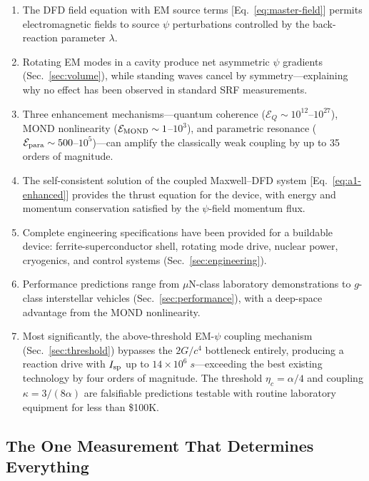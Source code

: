 \documentclass[twocolumn,prl,superscriptaddress,nofootinbib,longbibliography,floatfix]{revtex4-2}
\begin{document}
\begin{enumerate}
\item The DFD field equation with EM source terms
[Eq.~\eqref{eq:master-field}] permits electromagnetic fields to source
$\psi$ perturbations controlled by the back-reaction parameter $\lambda$.

\item Rotating EM modes in a cavity produce net asymmetric $\psi$
gradients (Sec.~\ref{sec:volume}), while standing waves cancel by
symmetry---explaining why no effect has been observed in standard SRF
measurements.

\item Three enhancement mechanisms---quantum coherence
($\mathcal{E}_Q \sim 10^{12}$--$10^{27}$), MOND nonlinearity
($\mathcal{E}_{\rm MOND} \sim 1$--$10^3$), and parametric resonance
($\mathcal{E}_{\rm para} \sim 500$--$10^5$)---can amplify the
classically weak coupling by up to 35 orders of magnitude.

\item The self-consistent solution of the coupled Maxwell--DFD system
[Eq.~\eqref{eq:a1-enhanced}] provides the thrust equation for the
device, with energy and momentum conservation satisfied by the
$\psi$-field momentum flux.

\item Complete engineering specifications have been provided for a
buildable device: ferrite-superconductor shell, rotating mode drive,
nuclear power, cryogenics, and control systems
(Sec.~\ref{sec:engineering}).

\item Performance predictions range from $\mu$N-class laboratory
demonstrations to $g$-class interstellar vehicles
(Sec.~\ref{sec:performance}), with a deep-space advantage from the MOND
nonlinearity.

\item Most significantly, the above-threshold EM-$\psi$ coupling
mechanism (Sec.~\ref{sec:threshold}) bypasses the $2G/c^4$ bottleneck
entirely, producing a reaction drive with $I_{\rm sp}$ up to
$14 \times 10^6\;\si{s}$---exceeding the best existing technology by
four orders of magnitude.  The threshold $\eta_c = \alpha/4$ and
coupling $\kappa = 3/(8\alpha)$ are falsifiable predictions testable
with routine laboratory equipment for less than \$100K.
\end{enumerate}

\subsection{The One Measurement That Determines Everything}
\end{document}
